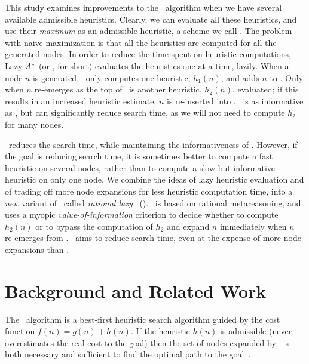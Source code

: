 
This study examines improvements to the \astar~algorithm when we have
several available admissible heuristics. Clearly, we can evaluate all
these heuristics, and use their {\em maximum} as an admissible
heuristic, a scheme we call \astarmax.  The problem with naive
maximization is that all the heuristics are computed for all the
generated nodes.  In order to reduce the time spent on heuristic
computations, Lazy $A^\ast$ (or \lazyastar, for short) evaluates the
heuristics one at a time, lazily.  When a node $n$ is generated,
\lazyastar~only computes one heuristic, $h_1(n)$, and adds $n$ to
\OPEN.  Only when $n$ re-emerges as the top of \OPEN~is another
heuristic, $h_2(n)$, evaluated; if this results in an increased
heuristic estimate, $n$ is re-inserted into \OPEN.  \lazyastar~is as
informative as \astarmax, but can significantly reduce search time, as
we will not need to compute $h_2$ for many nodes.

\lazyastar~reduces the search time, while maintaining the informativeness of \astarmax.
However, if the goal is reducing search time, it is sometimes better
to compute a fast heuristic on several nodes, rather than to compute a
slow but informative heuristic on only one node. We combine the ideas
of lazy heuristic evaluation and of trading off more node expansions
for less heuristic computation time, into a {\em new} variant of
\lazyastar~called {\em rational lazy} \astar~(\rationallazyastar).
\rationallazyastar~is based on rational metareasoning, and uses a
myopic {\em value-of-information} criterion to decide whether to
compute $h_2(n)$ or to bypass the computation of $h_2$ and expand $n$
immediately when $n$ re-emerges from \OPEN. \rationallazyastar~aims to
reduce search time, even at the expense of more node expansions than
\astarmax.

\section{Background and Related Work}

The \astar~algorithm \cite{ASTR68} is a best-first heuristic search
algorithm guided by the cost function $f(n)=g(n)+h(n)$.  If the
heuristic $h(n)$ is admissible (never overestimates the real cost to
the goal) then the set of nodes expanded by \astar~is both necessary
and sufficient to find the optimal path to the goal~\cite{ASTR85}.

